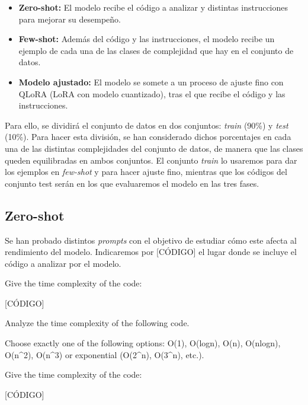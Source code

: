 \documentclass[12pt,twoside]{article}
\begin{document}
\begin{itemize}
    \item \textbf{Zero-shot:} El modelo recibe el código a analizar y distintas instrucciones para mejorar su desempeño.
    \item \textbf{Few-shot:} Además del código y las instrucciones, el modelo recibe un ejemplo de cada una de las clases de complejidad que hay en el conjunto de datos.
    \item \textbf{Modelo ajustado:} El modelo se somete a un proceso de ajuste fino con QLoRA (LoRA con modelo cuantizado), tras el que recibe el código y las instrucciones.
\end{itemize}

Para ello, se dividirá el conjunto de datos en dos conjuntos: \textit{train} (90\%) y \textit{test} (10\%). Para hacer esta división, se han considerado dichos porcentajes en cada una de las distintas complejidades del conjunto de datos, de manera que las clases queden equilibradas en ambos conjuntos. El conjunto \textit{train} lo usaremos para dar los ejemplos en \textit{few-shot} y para hacer ajuste fino, mientras que los códigos del conjunto test serán en los que evaluaremos el modelo en las tres fases.

\subsection{Zero-shot}
Se han probado distintos \textit{prompts} con el objetivo de estudiar cómo este afecta al rendimiento del modelo. Indicaremos por [CÓDIGO] el lugar donde se incluye el código a analizar por el modelo.

\begin{tcolorbox}[
  colback=gray!5,
  colframe=black,
  boxrule=0.5pt,
  breakable,
  title=Prompt 1 zero-shot,
]
Give the time complexity of the code:

[CÓDIGO]
\end{tcolorbox}

\begin{tcolorbox}[
  colback=gray!5,
  colframe=black,
  boxrule=0.5pt,
  breakable,
  title=Prompt 2 zero-shot,
]
Analyze the time complexity of the following code.

Choose exactly one of the following options: O(1), O(logn), O(n), O(nlogn), O(n\textasciicircum2), O(n\textasciicircum3) or exponential (O(2\textasciicircum n), O(3\textasciicircum n), etc.).

Give the time complexity of the code:

[CÓDIGO]
\end{tcolorbox}
\end{document}

